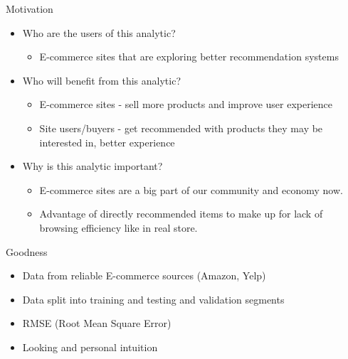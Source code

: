 \documentclass{beamer}
\begin{document}
\begin{frame}{Motivation}{}

  \begin{itemize}

      \item{ Who are the users of this analytic?}
      \begin{itemize}
          \item {E-commerce sites that are exploring better recommendation systems}
      \end{itemize}
      \item{ Who will benefit from this analytic?}
      \begin{itemize}
          \item {E-commerce sites - sell more products and improve user experience}
          \item{Site users/buyers - get recommended with products they may be interested in, better experience}
      \end{itemize}
      
      \item{ Why is this analytic important?}
      \begin{itemize}
          \item {E-commerce sites are a big part of our community and economy now.}
          \item{Advantage of directly recommended items to make up for lack of browsing efficiency like in real store.}
      \end{itemize}
 
  \end{itemize}
  
\end{frame}


\begin{frame}{Goodness}
  \begin{itemize}
  \item {
    Data from reliable E-commerce sources (Amazon, Yelp)
  }
  \item {   
    Data split into training and testing and validation segments
  }
  \item {
    RMSE (Root Mean Square Error) 
  }
  \item {
    Looking and personal intuition
  }
  \end{itemize}
\end{frame}
\end{document}
